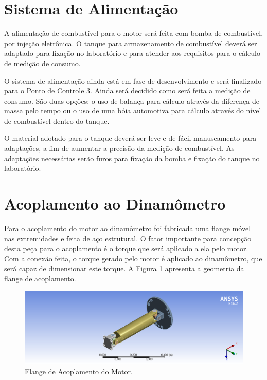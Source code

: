 	
\section{Sistema de Alimentação}

A alimentação de combustível para o motor será feita com bomba de combustível, por injeção eletrônica. O tanque para armazenamento de combustível deverá ser adaptado para fixação no laboratório e para atender aos requisitos para o cálculo de medição de consumo.

O sistema de alimentação ainda está em fase de desenvolvimento e será finalizado para o Ponto de Controle 3. Ainda será decidido como será feita a medição de consumo. São duas opções: o uso de balança para cálculo através da diferença de massa pelo tempo ou o uso de uma bóia automotiva para cálculo através do nível de combustível dentro do tanque.

O material adotado para o tanque deverá ser leve e de fácil manuseamento para adaptações, a fim de aumentar a precisão da medição de combustível. As adaptações necessárias serão furos para fixação da bomba e fixação do tanque no laboratório.


\vfill

\section{Acoplamento ao Dinamômetro}

Para o acoplamento do motor ao dinamômetro foi fabricada uma flange móvel nas extremidades e feita de aço estrutural. O fator importante para concepção desta peça para o acoplamento é o torque que será aplicado a ela pelo motor. Com a conexão feita, o torque gerado pelo motor é aplicado ao dinamômetro, que será capaz de dimensionar este torque. A Figura \ref{fig:flange} apresenta a geometria da flange de acoplamento.

\begin{figure}[h!]
	\centering
	\includegraphics[keepaspectratio=true,scale= 0.35]{figuras/Geometria.png}
	\caption{Flange de Acoplamento do Motor.}
	\label{fig:flange}
\end{figure}

